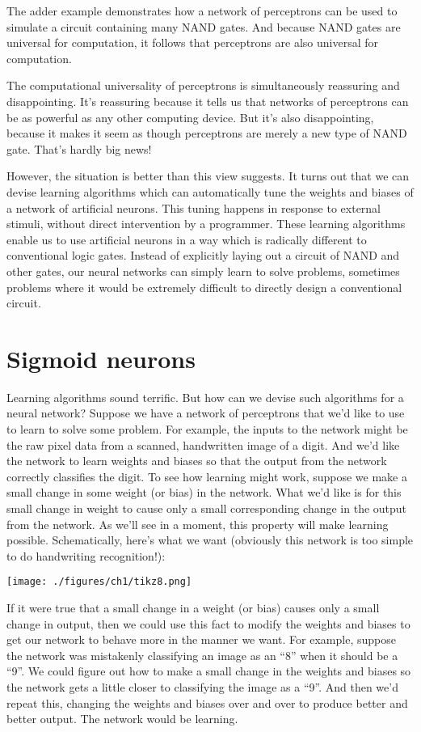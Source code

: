 \documentclass[a4paper,twoside,10pt]{book}
\begin{document}
The adder example demonstrates how a network of perceptrons can be used to simulate a circuit containing many NAND gates. And because NAND gates are universal for computation, it follows that perceptrons are also universal for computation.

The computational universality of perceptrons is simultaneously reassuring and disappointing. It's reassuring because it tells us that networks of perceptrons can be as powerful as any other computing device. But it's also disappointing, because it makes it seem as though perceptrons are merely a new type of NAND gate. That's hardly big news!

However, the situation is better than this view suggests. It turns out that we can devise learning algorithms which can automatically tune the weights and biases of a network of artificial neurons. This tuning happens in response to external stimuli, without direct intervention by a programmer. These learning algorithms enable us to use artificial neurons in a way which is radically different to conventional logic gates. Instead of explicitly laying out a circuit of NAND and other gates, our neural networks can simply learn to solve problems, sometimes problems where it would be extremely difficult to directly design a conventional circuit.

\section{Sigmoid neurons}
Learning algorithms sound terrific. But how can we devise such algorithms for a neural network? Suppose we have a network of perceptrons that we'd like to use to learn to solve some problem. For example, the inputs to the network might be the raw pixel data from a scanned, handwritten image of a digit. And we'd like the network to learn weights and biases so that the output from the network correctly classifies the digit. To see how learning might work, suppose we make a small change in some weight (or bias) in the network. What we'd like is for this small change in weight to cause only a small corresponding change in the output from the network. As we'll see in a moment, this property will make learning possible. Schematically, here's what we want (obviously this network is too simple to do handwriting recognition!):

\begin{center}
	\texttt{[image: ./figures/ch1/tikz8.png]}
\end{center}
If it were true that a small change in a weight (or bias) causes only a small change in output, then we could use this fact to modify the weights and biases to get our network to behave more in the manner we want. For example, suppose the network was mistakenly classifying an image as an ``8'' when it should be a ``9''. We could figure out how to make a small change in the weights and biases so the network gets a little closer to classifying the image as a ``9''. And then we'd repeat this, changing the weights and biases over and over to produce better and better output. The network would be learning.
\end{document}
